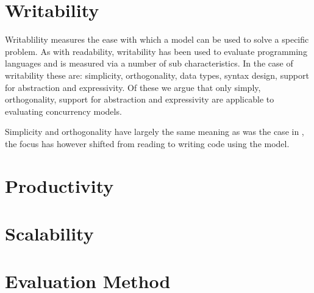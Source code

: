 \section{Writability}
Writablility measures the ease with which a model can be used to solve a specific problem\cite[p. 13]{sebestaProLang}. As with readability, writability has been used to evaluate programming languages and is measured via a number of sub characteristics. In the case of writability these are: simplicity, orthogonality, data types, syntax design, support for abstraction and expressivity. Of these we argue that only simply, orthogonality, support for abstraction and expressivity are applicable to evaluating concurrency models.

Simplicity and orthogonality have largely the same meaning as was the case in , the focus has however shifted from reading to writing code using the model. 


\section{Productivity}
\section{Scalability}
\section{Evaluation Method}

\worksheetend
